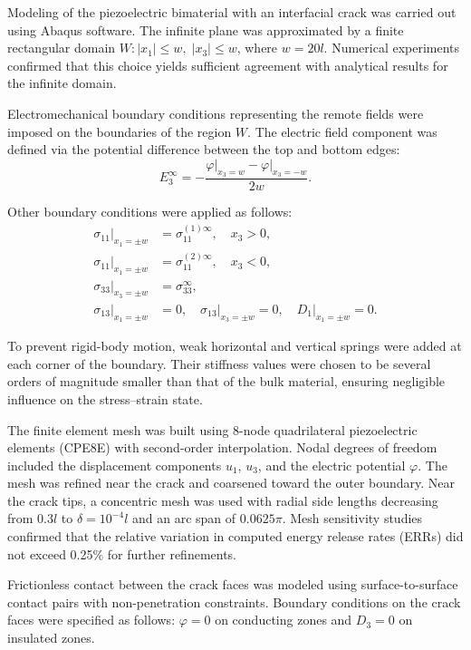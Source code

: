 Modeling of the piezoelectric bimaterial with an interfacial crack was carried out using Abaqus software. The infinite plane was approximated by a finite rectangular domain $W: |x_1| \le w,\; |x_3| \le w$, where $w = 20l$. Numerical experiments confirmed that this choice yields sufficient agreement with analytical results for the infinite domain.

Electromechanical boundary conditions representing the remote fields were imposed on the boundaries of the region $W$. The electric field component was defined via the potential difference between the top and bottom edges:
\begin{equation*}
    E_3^{\infty} = -\frac{\left.\varphi\right|_{x_3=w} - \left.\varphi\right|_{x_3=-w}}{2w}.
\end{equation*}

Other boundary conditions were applied as follows:
\begin{align*}
    \left. \sigma_{11} \right|_{x_1 = \pm w} &= \sigma_{11}^{(1)\infty}, \quad x_3 > 0, \\
    \left. \sigma_{11} \right|_{x_1 = \pm w} &= \sigma_{11}^{(2)\infty}, \quad x_3 < 0, \\
    \left. \sigma_{33} \right|_{x_3 = \pm w} &= \sigma_{33}^{\infty}, \\
    \left. \sigma_{13} \right|_{x_1 = \pm w} &= 0, \quad
    \left. \sigma_{13} \right|_{x_3 = \pm w} = 0, \quad
    \left. D_1 \right|_{x_1 = \pm w} = 0.
\end{align*}

To prevent rigid-body motion, weak horizontal and vertical springs were added at each corner of the boundary. Their stiffness values were chosen to be several orders of magnitude smaller than that of the bulk material, ensuring negligible influence on the stress–strain state.

The finite element mesh was built using 8-node quadrilateral piezoelectric elements (CPE8E) with second-order interpolation. Nodal degrees of freedom included the displacement components $u_1$, $u_3$, and the electric potential $\varphi$. The mesh was refined near the crack and coarsened toward the outer boundary. Near the crack tips, a concentric mesh was used with radial side lengths decreasing from $0.3l$ to $\delta = 10^{-4}l$ and an arc span of $0.0625\pi$. Mesh sensitivity studies confirmed that the relative variation in computed energy release rates (ERRs) did not exceed 0.25\% for further refinements.

Frictionless contact between the crack faces was modeled using surface-to-surface contact pairs with non-penetration constraints. Boundary conditions on the crack faces were specified as follows: $\varphi = 0$ on conducting zones and $D_3 = 0$ on insulated zones.

